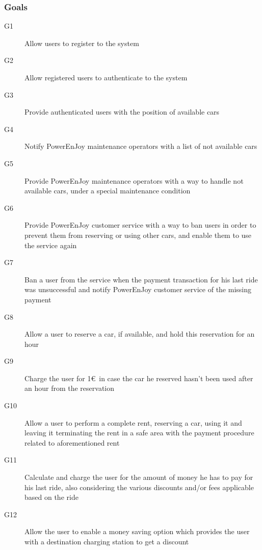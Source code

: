 	\subsubsection{Goals}
	\begin{description}
		\item[G1] Allow users to register to the system
		\item[G2] Allow registered users to authenticate to the system
		\item[G3] Provide authenticated users with the position of available cars
		\item[G4] Notify PowerEnJoy maintenance operators with a list of not available cars 
		\item[G5] Provide PowerEnJoy maintenance operators with a way to handle not available cars, under a special maintenance condition 
		\item[G6] Provide PowerEnJoy customer service with a way to ban users in order to prevent them from reserving or using other cars, and enable them to use the service again
		\item[G7] Ban a user from the service when the payment transaction for his last ride was unsuccessful and notify PowerEnJoy customer service of the missing payment
		\item[G8] Allow a user to reserve a car, if available, and hold this reservation for an hour
		\item[G9] Charge the user for 1\euro\ in case the car he reserved hasn't been used after an hour from the reservation
		\item[G10] Allow a user to perform a complete rent, reserving a car, using it and leaving it terminating the rent in a safe area with the payment procedure related to aforementioned rent 
		\item[G11] Calculate and charge the user for the amount of money he has to pay for his last ride, also considering the various discounts and/or fees applicable based on the ride
		\item[G12] Allow the user to enable a money saving option which provides the user with a destination charging station to get a discount
	\end{description}


